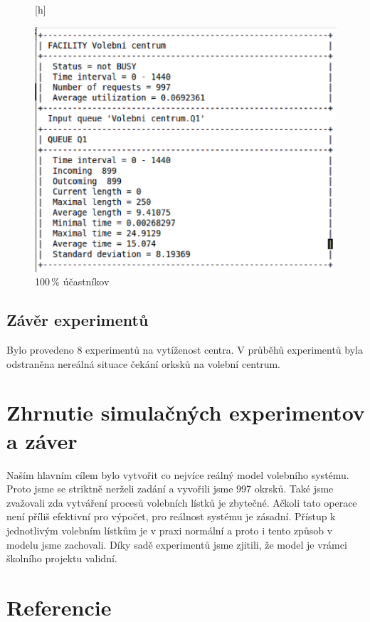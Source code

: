\documentclass[12pt,a4paper,titlepage,final]{article}
\begin{document}
\begin{figure}

\begin{center}[h]

\includegraphics[scale=0.7]{img/100_second_part.eps} 
\caption{100\,\% účastníkov}
\label{102}

\end{center}

\end{figure}
\newline
\newline
\newpage
\subsection{Závěr experimentů}
Bylo provedeno 8 experimentů na vytíženost centra. V průběhů experimentů byla odstraněna nereálná situace čekání orksků na volební centrum.


\section{Zhrnutie simulačných experimentov a záver}
Naším hlavním cílem bylo vytvořit co nejvíce reálný model volebního systému. Proto jsme se striktně nerželi zadání a vyvořili jsme 997 okrsků. Také jsme zvažovali zda vytváření procesů volebních lístků je zbytečné. Ačkoli tato operace není příliš efektivní pro výpočet, pro reálnost systému je zásadní. Přístup k jednotlivým volebním lístkům je v praxi normální a proto i tento způsob v modelu jsme zachovali.\newline
Díky sadě experimentů jsme zjitili, že model je vrámci školního projektu validní.


\newpage

\section{Referencie}





\newpage
\end{document}

